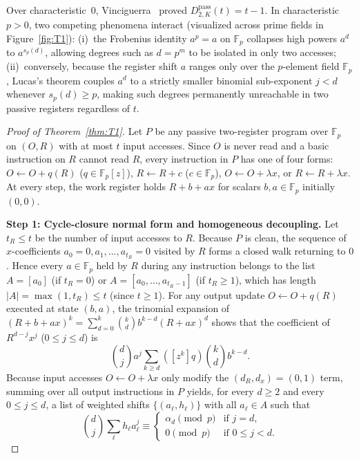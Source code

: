 \documentclass[11pt,reqno]{amsart}
\theoremstyle{definition}
\newcommand{\F}{\mathbb{F}}
\newcommand{\pass}{\mathrm{pass}}
\begin{document}
Over characteristic~$0$, Vinciguerra~\cite[Theorem~3.5]{Vinciguerra2026} proved $D_{2, K}^{\pass}(t) = t - 1$.
In characteristic $p > 0$, two competing phenomena interact (visualized across prime fields in Figure~\ref{fig:T1}):
(i)~the Frobenius identity $a^p = a$ on $\F_p$ collapses high powers $a^d$ to $a^{s_p(d)}$, allowing degrees such as $d = p^m$ to be isolated in only two accesses;
(ii)~conversely, because the register shift $a$ ranges only over the $p$-element field $\F_p$, Lucas's theorem couples $a^d$ to a strictly smaller binomial sub-exponent $j < d$ whenever $s_p(d) \ge p$, making such degrees permanently unreachable in two passive registers regardless of $t$.

\begin{proof}[Proof of Theorem~\ref{thm:T1}]
Let $P$ be any passive two-register program over $\F_p$ on $(O, R)$ with at most $t$ input accesses.
Since $O$ is never read and a basic instruction on $R$ cannot read $R$, every instruction in $P$ has one of four forms:
$O \leftarrow O + q(R)$ ($q \in \F_p[z]$), $R \leftarrow R + c$ ($c \in \F_p$), $O \leftarrow O + \lambda x$, or $R \leftarrow R + \lambda x$.
At every step, the work register holds $R + b + a x$ for scalars $b, a \in \F_p$ initially $(0, 0)$.

\smallskip
\noindent\textbf{Step 1: Cycle-closure normal form and homogeneous decoupling.}
Let $t_R \le t$ be the number of input accesses to $R$.
Because $P$ is clean, the sequence of $x$-coefficients $a_0 = 0, a_1, \dots, a_{t_R} = 0$ visited by $R$ forms a closed walk returning to $0$.
Hence every $a \in \F_p$ held by $R$ during any instruction belongs to the list $A = [a_0]$ (if $t_R = 0$) or $A = [a_0, \dots, a_{t_R-1}]$ (if $t_R \ge 1$), which has length $|A| = \max(1, t_R) \le t$ (since $t \ge 1$).
For any output update $O \leftarrow O + q(R)$ executed at state $(b, a)$, the trinomial expansion of $(R + b + a x)^k = \sum_{d=0}^k \binom{k}{d} b^{k-d} (R + a x)^d$ shows that the coefficient of $R^{d-j} x^j$ ($0 \le j \le d$) is
\[
  \binom{d}{j} a^j \sum_{k \ge d} ([z^k] q) \binom{k}{d} b^{k-d}.
\]
Because input accesses $O \leftarrow O + \lambda x$ only modify the $(d_R, d_x) = (0, 1)$ term, summing over all output instructions in $P$ yields, for every $d \ge 2$ and every $0 \le j \le d$, a list of weighted shifts $\{(a_\ell, h_\ell)\}$ with all $a_\ell \in A$ such that
\begin{equation}
\label{eq:decoupled}
  \binom{d}{j} \sum_{\ell} h_\ell a_\ell^j \equiv
  \begin{cases}
    \alpha_d \pmod{p} & \text{if } j = d, \\
    0 \pmod{p} & \text{if } 0 \le j < d.
  \end{cases}
\end{equation}


\end{proof}
\end{document}
